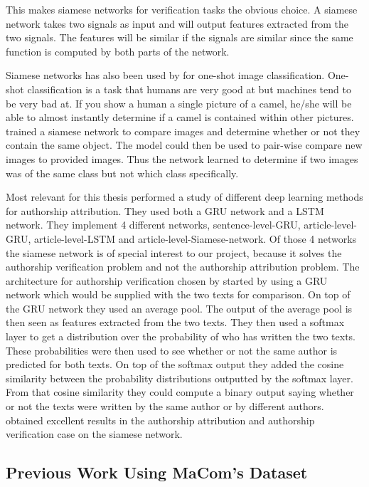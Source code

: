 This makes siamese networks for verification tasks the obvious choice. A siamese
network takes two signals as input and will output features extracted from the
two signals. The features will be similar if the signals are similar since the
same function is computed by both parts of the network.

Siamese networks has also been used by \citet{Koch2015SiameseNN} for one-shot
image classification. One-shot classification is a task that humans are very
good at but machines tend to be very bad at. If you show a human a single
picture of a camel, he/she will be able to almost instantly determine if a camel
is contained within other pictures. \citet{Koch2015SiameseNN} trained a siamese
network to compare images and determine whether or not they contain the same
object. The model could then be used to pair-wise compare new images to provided
images. Thus the network learned to determine if two images was of the same
class but not which class specifically.

Most relevant for this thesis \citet{qian:2018} performed a study of different
deep learning methods for authorship attribution. They used both a \gls{GRU}
network and a \gls{LSTM} network. They implement 4 different networks,
sentence-level-\gls{GRU}, article-level-\gls{GRU}, article-level-\gls{LSTM} and
article-level-Siamese-network. Of those 4 networks the siamese network is of
special interest to our project, because it solves the authorship verification
problem and not the authorship attribution problem. The architecture for
authorship verification chosen by \citet{qian:2018} started by using a \gls{GRU}
network which would be supplied with the two texts for comparison. On top of
the \gls{GRU} network they used an average pool. The output of the average pool
is then seen as features extracted from the two texts. They then used a softmax
layer to get a distribution over the probability of who has written the two
texts. These probabilities were then used to see whether or not the same author
is predicted for both texts. On top of the softmax output they added the cosine
similarity between the probability distributions outputted by the softmax layer.
From that cosine similarity they could compute a binary output saying whether
or not the texts were written by the same author or by different authors.
\citet{qian:2018} obtained excellent results in the authorship attribution and
authorship verification case on the siamese network.


\subsection{Previous Work Using MaCom's Dataset}
\label{subsec:previous_work_using_macoms_dataset}

